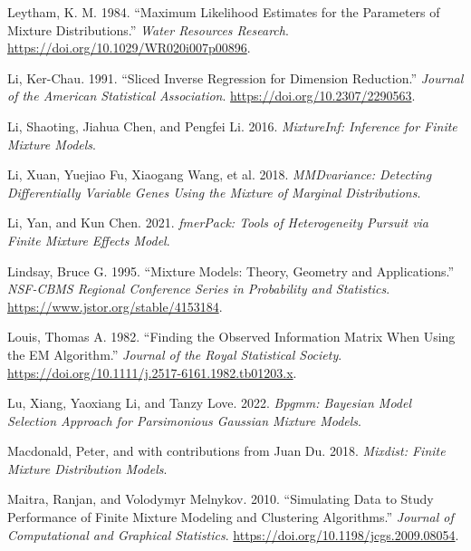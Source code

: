 \begin{CSLReferences}{1}{0}
\leavevmode{}%
Leytham, K. M. 1984. {``Maximum {Likelihood Estimates} for the {Parameters} of {Mixture Distributions}.''} \emph{Water Resources Research}. \url{https://doi.org/10.1029/WR020i007p00896}.

\leavevmode{}%
Li, Ker-Chau. 1991. {``Sliced {Inverse} {Regression} for {Dimension} {Reduction}.''} \emph{Journal of the American Statistical Association}. \url{https://doi.org/10.2307/2290563}.

\leavevmode{}%
Li, Shaoting, Jiahua Chen, and Pengfei Li. 2016. \emph{MixtureInf: Inference for Finite Mixture Models}.

\leavevmode{}%
Li, Xuan, Yuejiao Fu, Xiaogang Wang, et al. 2018. \emph{MMDvariance: Detecting Differentially Variable Genes Using the Mixture of Marginal Distributions}.

\leavevmode{}%
Li, Yan, and Kun Chen. 2021. \emph{fmerPack: Tools of Heterogeneity Pursuit via Finite Mixture Effects Model}.

\leavevmode{}%
Lindsay, Bruce G. 1995. {``Mixture {Models}: {Theory}, {Geometry} and {Applications}.''} \emph{NSF-CBMS Regional Conference Series in Probability and Statistics}. \url{https://www.jstor.org/stable/4153184}.

\leavevmode{}%
Louis, Thomas A. 1982. {``Finding the {Observed Information Matrix} When {Using} the {EM Algorithm}.''} \emph{Journal of the Royal Statistical Society}. \url{https://doi.org/10.1111/j.2517-6161.1982.tb01203.x}.

\leavevmode{}%
Lu, Xiang, Yaoxiang Li, and Tanzy Love. 2022. \emph{Bpgmm: Bayesian Model Selection Approach for Parsimonious Gaussian Mixture Models}.

\leavevmode{}%
Macdonald, Peter, and with contributions from Juan Du. 2018. \emph{Mixdist: Finite Mixture Distribution Models}.

\leavevmode{}%
Maitra, Ranjan, and Volodymyr Melnykov. 2010. {``Simulating {Data} to {Study Performance} of {Finite Mixture Modeling} and {Clustering Algorithms}.''} \emph{Journal of Computational and Graphical Statistics}. \url{https://doi.org/10.1198/jcgs.2009.08054}.


\end{CSLReferences}
